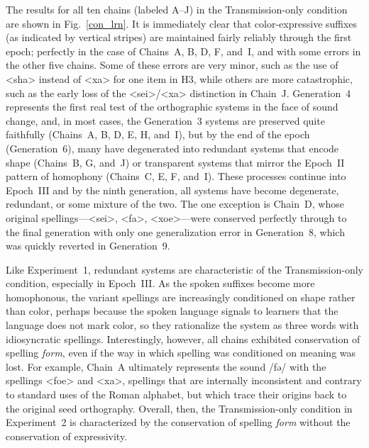 \documentclass[doc,biblatex]{apa7}
\begin{document}
The results for all ten chains (labeled A--J) in the Transmission-only condition are shown in Fig.~\ref{con_lrn}. It is immediately clear that color-expressive suffixes (as indicated by vertical stripes) are maintained fairly reliably through the first epoch; perfectly in the case of Chains~A, B, D, F, and~I, and with some errors in the other five chains. Some of these errors are very minor, such as the use of <sha> instead of <xa> for one item in H3, while others are more catastrophic, such as the early loss of the <sei>/<xa> distinction in Chain~J. Generation~4 represents the first real test of the orthographic systems in the face of sound change, and, in most cases, the Generation~3 systems are preserved quite faithfully (Chains~A, B, D, E, H, and~I), but by the end of the epoch (Generation~6), many have degenerated into redundant systems that encode shape (Chains~B, G, and~J) or transparent systems that mirror the Epoch~II pattern of homophony (Chains~C, E, F, and~I). These processes continue into Epoch~III and by the ninth generation, all systems have become degenerate, redundant, or some mixture of the two. The one exception is Chain~D, whose original spellings---<sei>, <fa>, <xoe>---were conserved perfectly through to the final generation with only one generalization error in Generation~8, which was quickly reverted in Generation~9.

Like Experiment~1, redundant systems are characteristic of the Transmission-only condition, especially in Epoch~III. As the spoken suffixes become more homophonous, the variant spellings are increasingly conditioned on shape rather than color, perhaps because the spoken language signals to learners that the language does not mark color, so they rationalize the system as three words with idiosyncratic spellings. Interestingly, however, all chains exhibited conservation of spelling \textit{form}, even if the way in which spelling was conditioned on meaning was lost. For example, Chain~A ultimately represents the sound /fə/ with the spellings <foe> and <xa>, spellings that are internally inconsistent and contrary to standard uses of the Roman alphabet, but which trace their origins back to the original seed orthography. Overall, then, the Transmission-only condition in Experiment~2 is characterized by the conservation of spelling \textit{form} without the conservation of expressivity.
\end{document}
